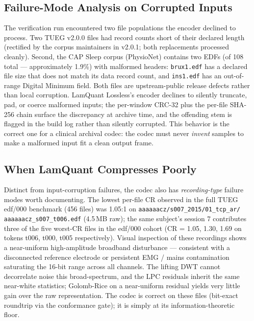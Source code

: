 \documentclass[journal]{IEEEtran}
\begin{document}
\subsection{Failure-Mode Analysis on Corrupted Inputs}
\label{sec:failure-mode}
The verification run encountered two file populations the
encoder declined to process. Two TUEG v2.0.0 files had record
counts short of their declared length (rectified by the corpus
maintainers in v2.0.1; both replacements processed cleanly). Second, the CAP Sleep corpus
(PhysioNet) contains two EDFs (of 108 total --- approximately
1.9\%) with malformed headers: \texttt{brux1.edf} has a
declared file size that does not match its data record count,
and \texttt{ins1.edf} has an out-of-range Digital Minimum
field. Both files are upstream-public release defects rather than
local corruption. LamQuant Lossless's encoder declines to silently
truncate, pad, or coerce malformed inputs; the per-window CRC-32
plus the per-file SHA-256 chain surface the discrepancy at archive
time, and the offending stem is flagged in the build log rather
than silently corrupted. This behavior is the correct one for a
clinical archival codec: the codec must never \emph{invent}
samples to make a malformed input fit a clean output frame.

\subsection{When LamQuant Compresses Poorly}
\label{sec:poor-compression}
Distinct from input-corruption failures, the codec also has
\emph{recording-type} failure modes worth documenting. The lowest
per-file CR observed in the full TUEG\,edf/000 benchmark (456
files) was 1.05:1 on \texttt{aaaaaacz/s007\_2015/01\_tcp\_ar/
aaaaaacz\_s007\_t006.edf} (4.5\,MB raw); the same subject's
session 7 contributes three of the five worst-CR files in the
edf/000 cohort (CR = 1.05, 1.30, 1.69 on tokens
t006, t000, t005 respectively). Visual inspection of these
recordings shows a near-uniform high-amplitude broadband
disturbance --- consistent with a disconnected reference
electrode or persistent EMG / mains contamination saturating the
16-bit range across all channels. The lifting DWT cannot
decorrelate noise this broad-spectrum, and the LPC residuals
inherit the same near-white statistics; Golomb-Rice on a
near-uniform residual yields very little gain over the raw
representation. The codec is correct on these files (bit-exact
roundtrip via the conformance gate); it is simply at its
information-theoretic floor.
\end{document}
